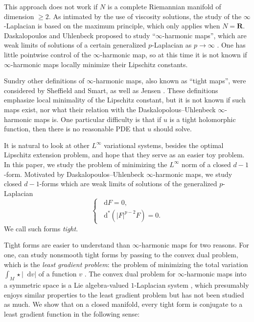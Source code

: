 \documentclass[reqno,11pt]{amsart}
\newcommand{\RR}{\mathbf{R}}
\newcommand*\dif{\mathop{}\!\mathrm{d}}
\newcommand{\dfn}[1]{\emph{#1}\index{#1}}
\theoremstyle{definition}
\numberwithin{equation}{section}
\begin{document}
This approach does not work if $N$ is a complete Riemannian manifold of dimension $\geq 2$.
As intimated by the use of viscosity solutions, the study of the $\infty$-Laplacian is based on the maximum principle, which only applies when $N = \RR$.
Daskalopoulos and Uhlenbeck proposed to study ``$\infty$-harmonic maps'', which are weak limits of solutions of a certain generalized $p$-Laplacian as $p \to \infty$ \cite{daskalopoulos2022}.
One has little pointwise control of the $\infty$-harmonic map, so at this time it is not known if $\infty$-harmonic maps locally minimize their Lipschitz constants.

Sundry other definitions of $\infty$-harmonic maps, also known as ``tight maps'', were considered by Sheffield and Smart, as well as Jensen \cite{Sheffield12}.
These definitions emphasize local minimality of the Lipschitz constant, but it is not known if such maps exist, nor what their relation with the Daskalopolous--Uhlenbeck $\infty$-harmonic maps is.
One particular difficulty is that if $u$ is a tight holomorphic function, then there is no reasonable PDE that $u$ should solve.

It is natural to look at other $L^\infty$ variational systems, besides the optimal Lipschitz extension problem, and hope that they serve as an easier toy problem.
In this paper, we study the problem of minimizing the $L^\infty$ norm of a closed $d - 1$-form.
Motivated by Daskalopoulos--Uhlenbeck $\infty$-harmonic maps, we study closed $d - 1$-forms which are weak limits of solutions of the generalized $p$-Laplacian 
\begin{equation}\label{p tight intro}
\begin{cases}
\dif F = 0, \\ 
\dif^*(|F|^{p - 2} F) = 0.
\end{cases}
\end{equation}
We call such forms \dfn{tight}.

Tight forms are easier to understand than $\infty$-harmonic maps for two reasons.
For one, can study nonsmooth tight forms by passing to the convex dual problem, which is the \dfn{least gradient problem}: the problem of minimizing the total variation $\int_M \star |\dif v|$ of a function $v$ \cite{gorny2024leastgradient}.
The convex dual problem for $\infty$-harmonic maps into a symmetric space is a Lie algebra-valued $1$-Laplacian system \cite{daskalopoulos2022}, which presumably enjoys similar properties to the least gradient problem but has not been studied as much.
We show that on a closed manifold, every tight form is conjugate to a least gradient function in the following sense:
\end{document}
